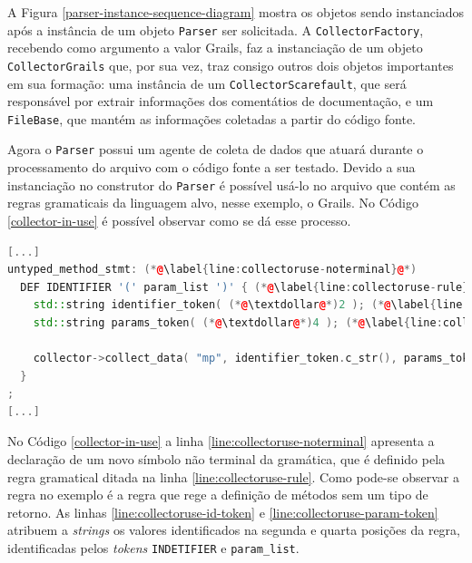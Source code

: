 A Figura \ref{parser-instance-sequence-diagram} mostra os objetos sendo
instanciados após a instância de um objeto \lstinline|Parser| ser solicitada.
A \lstinline|CollectorFactory|, recebendo como argumento a valor \textsf{Grails},
faz a instanciação de um objeto \lstinline|CollectorGrails| que, por sua vez,
traz consigo outros dois objetos importantes em sua formação: uma instância de um
\lstinline|CollectorScarefault|, que será responsável por extrair informações
dos comentátios de documentação, e um \lstinline|FileBase|, que mantém as informações
coletadas a partir do código fonte.

Agora o \lstinline|Parser| possui um agente de coleta de dados que atuará durante
o processamento do arquivo com o código fonte a ser testado. Devido a sua instanciação
no construtor do \lstinline|Parser| é possível usá-lo no arquivo que contém as regras
gramaticais da linguagem alvo, nesse exemplo, o \textsf{Grails}. No Código
\ref{collector-in-use} é possível observar como se dá esse processo.

\begin{lstlisting}[language=C++, label=collector-in-use, caption=Agente coletor em uso no \parser]
[...]
untyped_method_stmt: (*@\label{line:collectoruse-noterminal}@*)
  DEF IDENTIFIER '(' param_list ')' { (*@\label{line:collectoruse-rule}@*)
    std::string identifier_token( (*@\textdollar@*)2 ); (*@\label{line:collectoruse-id-token}@*)
    std::string params_token( (*@\textdollar@*)4 ); (*@\label{line:collectoruse-param-token}@*)

    collector->collect_data( "mp", identifier_token.c_str(), params_token.c_str() ); (*@\label{line:collectoruse-collect-data}@*)
  }
;
[...]
\end{lstlisting}

No Código \ref{collector-in-use} a linha \ref{line:collectoruse-noterminal}
apresenta a declaração de um novo símbolo não terminal da gramática, que é
definido pela regra gramatical ditada na linha \ref{line:collectoruse-rule}.
Como pode-se observar a regra no exemplo é a regra que rege a definição de
métodos sem um tipo de retorno. As linhas \ref{line:collectoruse-id-token} e
\ref{line:collectoruse-param-token} atribuem a \textit{strings} os valores
identificados na segunda e quarta posições da regra, identificadas pelos
\textit{tokens} \lstinline|INDETIFIER| e \lstinline|param_list|.

